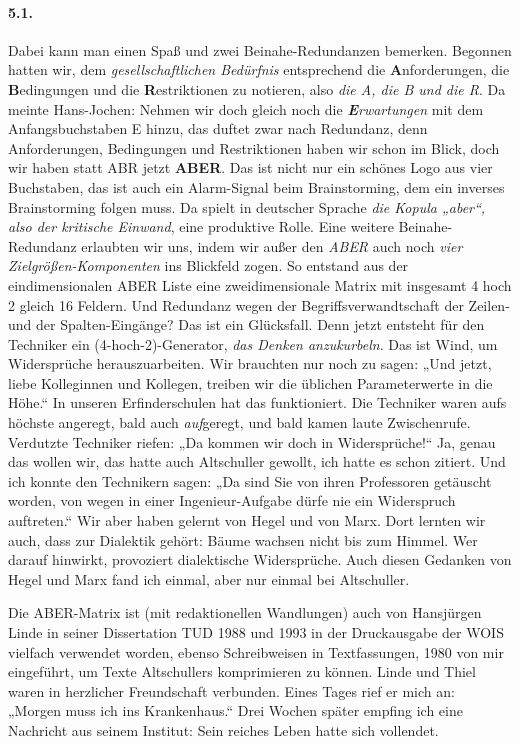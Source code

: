 \documentclass[12pt,a4paper]{article}
\begin{document}
\paragraph{5.1.}
Dabei kann man einen Spaß und zwei Beinahe-Redundanzen bemerken. Begonnen
hatten wir, dem \emph{gesellschaftlichen Bedürfnis} entsprechend die
\textbf{A}nforderungen, die \textbf{B}edingungen und die
\textbf{R}estriktionen zu notieren, also \emph{die A, die B und die R}. Da
meinte Hans-Jochen: Nehmen wir doch gleich noch die
\emph{\textbf{E}rwartungen} mit dem Anfangsbuchstaben E hinzu, das duftet zwar
nach Redundanz, denn Anforderungen, Bedingungen und Restriktionen haben wir
schon im Blick, doch wir haben statt ABR jetzt \textbf{ABER}. Das ist nicht
nur ein schönes Logo aus vier Buchstaben, das ist auch ein Alarm-Signal beim
Brainstorming, dem ein inverses Brainstorming folgen muss. Da spielt in
deutscher Sprache \emph{die Kopula „aber“, also der kritische Einwand}, eine
produktive Rolle. Eine weitere Beinahe-Redundanz erlaubten wir uns, indem wir
außer den \emph{ABER} auch noch \emph{vier Zielgrößen-Komponenten} ins
Blickfeld zogen. So entstand aus der eindimensionalen ABER Liste eine
zweidimensionale Matrix mit insgesamt 4 hoch 2 gleich 16 Feldern. Und
Redundanz wegen der Begriffsverwandtschaft der Zeilen- und der
Spalten-Eingänge? Das ist ein Glücksfall. Denn jetzt entsteht für den
Techniker ein (4-hoch-2)-Generator, \emph{das Denken anzukurbeln}. Das ist
Wind, um Widersprüche herauszuarbeiten. Wir brauchten nur noch zu sagen: „Und
jetzt, liebe Kolleginnen und Kollegen, treiben wir die üblichen Parameterwerte
in die Höhe.“ In unseren Erfinderschulen hat das funktioniert. Die Techniker
waren aufs höchste angeregt, bald auch \emph{auf}geregt, und bald kamen laute
Zwischenrufe. Verdutzte Techniker riefen: „Da kommen wir doch in
Widersprüche!“ Ja, genau das wollen wir, das hatte auch Altschuller gewollt,
ich hatte es schon zitiert. Und ich konnte den Technikern sagen: „Da sind Sie
von ihren Professoren getäuscht worden, von wegen in einer Ingenieur-Aufgabe
dürfe nie ein Widerspruch auftreten.“ Wir aber haben gelernt von Hegel und von
Marx.  Dort lernten wir auch, dass zur Dialektik gehört: Bäume wachsen nicht
bis zum Himmel. Wer darauf hinwirkt, provoziert dialektische Widersprüche.
Auch diesen Gedanken von Hegel und Marx fand ich einmal, aber nur einmal bei
Altschuller.

Die ABER-Matrix ist (mit redaktionellen Wandlungen) auch von Hansjürgen Linde
in seiner Dissertation TUD 1988 und 1993 in der Druckausgabe der WOIS vielfach
verwendet worden, ebenso Schreibweisen in Textfassungen, 1980 von mir
eingeführt, um Texte Altschullers komprimieren zu können. Linde und Thiel
waren in herzlicher Freundschaft verbunden. Eines Tages rief er mich an:
„Morgen muss ich ins Krankenhaus.“ Drei Wochen später empfing ich eine
Nachricht aus seinem Institut: Sein reiches Leben hatte sich vollendet.
\end{document}
